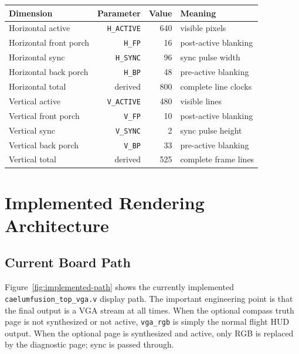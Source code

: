 \documentclass{article}
\newcommand{\sig}[1]{\begingroup\nolinkurl{#1}\endgroup}
\newcommand{\file}[1]{\begingroup\nolinkurl{#1}\endgroup}
\newcommand{\param}[1]{\begingroup\nolinkurl{#1}\endgroup}
\begin{document}
\begin{center}
\begin{tabular}{l r r l}
\toprule
\textbf{Dimension} & \textbf{Parameter} & \textbf{Value} & \textbf{Meaning} \\
\midrule
Horizontal active & \param{H_ACTIVE} & 640 & visible pixels \\
Horizontal front porch & \param{H_FP} & 16 & post-active blanking \\
Horizontal sync & \param{H_SYNC} & 96 & sync pulse width \\
Horizontal back porch & \param{H_BP} & 48 & pre-active blanking \\
Horizontal total & derived & 800 & complete line clocks \\
\midrule
Vertical active & \param{V_ACTIVE} & 480 & visible lines \\
Vertical front porch & \param{V_FP} & 10 & post-active blanking \\
Vertical sync & \param{V_SYNC} & 2 & sync pulse height \\
Vertical back porch & \param{V_BP} & 33 & pre-active blanking \\
Vertical total & derived & 525 & complete frame lines \\
\bottomrule
\end{tabular}
\end{center}

\section{Implemented Rendering Architecture}

\subsection{Current Board Path}

Figure~\ref{fig:implemented-path} shows the currently implemented
\file{caelumfusion_top_vga.v} display path.  The important engineering point is
that the final output is a VGA stream at all times.  When the optional compass
truth page is not synthesized or not active, \sig{vga_rgb} is simply the normal
flight HUD output.  When the optional page is synthesized and active, only RGB
is replaced by the diagnostic page; sync is passed through.
\end{document}
